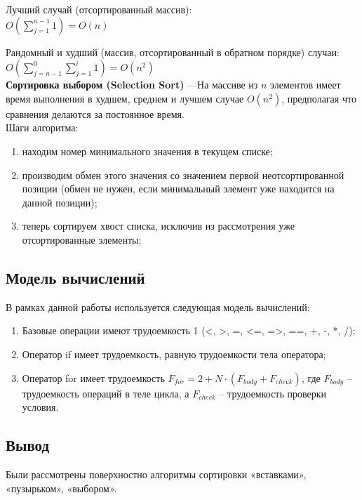 \documentclass[a4paper, 14pt]{article}
\begin{document}
Лучший случай (отсортированный массив): \\
$O(\sum\limits_{j=1}^{n-1}1)=O(n)$

Рандомный и худший (массив, отсортированный в обратном порядке) случаи: \\
$O(\sum\limits_{j=n-1}^{0}\sum\limits_{j=1}^{i}1)=O(n^2)$\\

\textbf{Сортировка выбором (Selection Sort)}
 —На массиве из $n$ элементов имеет время выполнения в худшем, среднем и лучшем случае $O(n^{2})$, предполагая что сравнения делаются за постоянное время. \cite{knut}\\

Шаги алгоритма:
\begin{enumerate}
	\item находим номер минимального значения в текущем списке;
	\item производим обмен этого значения со значением первой неотсортированной позиции (обмен не нужен, если минимальный элемент уже находится на данной позиции);
	\item теперь сортируем хвост списка, исключив из рассмотрения уже отсортированные элементы;
\end{enumerate}

	
	\subsection{Модель вычислений}
	
	В рамках данной работы используется следующая модель вычислений:
	
\begin{enumerate}
  	\item Базовые операции имеют трудоемкость 1 (<, >, =, <=, =>, ==, +, -, *, /);
	\item Оператор if имеет трудоемкость, равную трудоемкости тела оператора;
	\item Оператор for имеет трудоемкость  $F_{for} = 2 + N \cdot (F_{body} + F_{cheсk})$, где $F_{body}$ – трудоемкость операций в теле цикла, а $F_{check}$ – трудоемкость проверки условия.
\end{enumerate}
	
	\subsection{Вывод}
	Были рассмотрены поверхностно алгоритмы сортировки «вставками», «пузырьком», «выбором».
	
	\newpage
\end{document}

